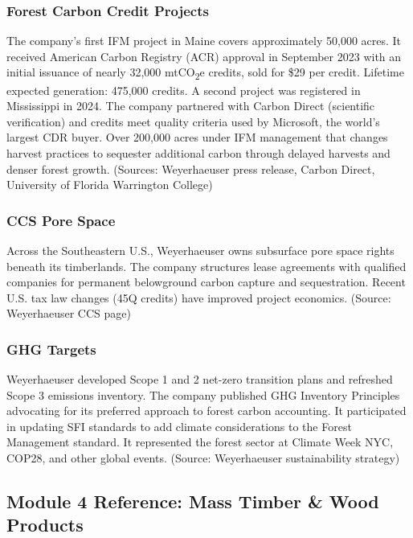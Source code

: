 \documentclass[11pt,letterpaper]{article}
\begin{document}
\subsubsection{Forest Carbon Credit Projects}

The company's first IFM project in Maine covers approximately 50,000 acres. It received American Carbon Registry (ACR) approval in September 2023 with an initial issuance of nearly 32,000 mtCO\textsubscript{2}e credits, sold for \$29 per credit. Lifetime expected generation: 475,000 credits. A second project was registered in Mississippi in 2024. The company partnered with Carbon Direct (scientific verification) and credits meet quality criteria used by Microsoft, the world's largest CDR buyer. Over 200,000 acres under IFM management that changes harvest practices to sequester additional carbon through delayed harvests and denser forest growth. (Sources: Weyerhaeuser press release, Carbon Direct, University of Florida Warrington College)

\subsubsection{CCS Pore Space}

Across the Southeastern U.S., Weyerhaeuser owns subsurface pore space rights beneath its timberlands. The company structures lease agreements with qualified companies for permanent belowground carbon capture and sequestration. Recent U.S. tax law changes (45Q credits) have improved project economics. (Source: Weyerhaeuser CCS page)

\subsubsection{GHG Targets}

Weyerhaeuser developed Scope 1 and 2 net-zero transition plans and refreshed Scope 3 emissions inventory. The company published GHG Inventory Principles advocating for its preferred approach to forest carbon accounting. It participated in updating SFI standards to add climate considerations to the Forest Management standard. It represented the forest sector at Climate Week NYC, COP28, and other global events. (Source: Weyerhaeuser sustainability strategy)

\subsection{Module 4 Reference: Mass Timber \& Wood Products}
\end{document}
